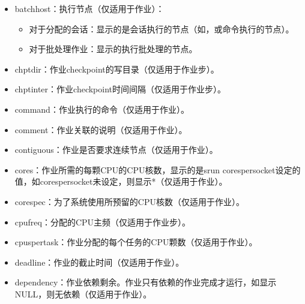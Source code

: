 \documentclass[a4paper,12pt,english]{sphinxmanual}
\begin{document}
\begin{itemize}
\begin{itemize}
\begin{itemize}
\item {} 
\sphinxAtStartPar
batchhost：执行节点（仅适用于作业）：
\begin{itemize}
\item {} 
\sphinxAtStartPar
对于分配的会话：显示的是会话执行的节点（如，或命令执行的节点）。

\item {} 
\sphinxAtStartPar
对于批处理作业：显示的执行批处理的节点。

\end{itemize}

\item {} 
\sphinxAtStartPar
chptdir：作业checkpoint的写目录（仅适用于作业步）。

\item {} 
\sphinxAtStartPar
chptinter：作业checkpoint时间间隔（仅适用于作业步）。

\item {} 
\sphinxAtStartPar
command：作业执行的命令（仅适用于作业）。

\item {} 
\sphinxAtStartPar
comment：作业关联的说明（仅适用于作业）。

\item {} 
\sphinxAtStartPar
contiguous：作业是否要求连续节点（仅适用于作业）。

\item {} 
\sphinxAtStartPar
cores：作业所需的每颗CPU的CPU核数，显示的是srun \sphinxhyphen{}\sphinxhyphen{}cores\sphinxhyphen{}per\sphinxhyphen{}socket设定的值，如\sphinxhyphen{}\sphinxhyphen{}cores\sphinxhyphen{}per\sphinxhyphen{}socket未设定，则显示*（仅适用于作业）。

\item {} 
\sphinxAtStartPar
corespec：为了系统使用所预留的CPU核数（仅适用于作业）。

\item {} 
\sphinxAtStartPar
cpufreq：分配的CPU主频（仅适用于作业步）。

\item {} 
\sphinxAtStartPar
cpuspertask：作业分配的每个任务的CPU颗数（仅适用于作业）。

\item {} 
\sphinxAtStartPar
deadline：作业的截止时间（仅适用于作业）。

\item {} 
\sphinxAtStartPar
dependency：作业依赖剩余。作业只有依赖的作业完成才运行，如显示NULL，则无依赖（仅适用于作业）。


\end{itemize}
\end{itemize}
\end{itemize}
\end{document}
